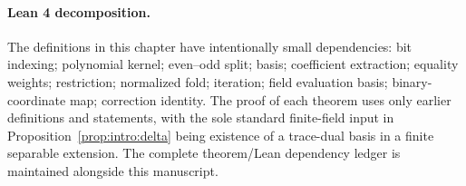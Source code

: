 \paragraph{Lean 4 decomposition.} The definitions in this chapter have intentionally small dependencies: bit indexing; polynomial kernel; even--odd split; basis; coefficient extraction; equality weights; restriction; normalized fold; iteration; field evaluation basis; binary-coordinate map; correction identity. The proof of each theorem uses only earlier definitions and statements, with the sole standard finite-field input in Proposition~\ref{prop:intro:delta} being existence of a trace-dual basis in a finite separable extension. The complete theorem/Lean dependency ledger is maintained alongside this manuscript.
